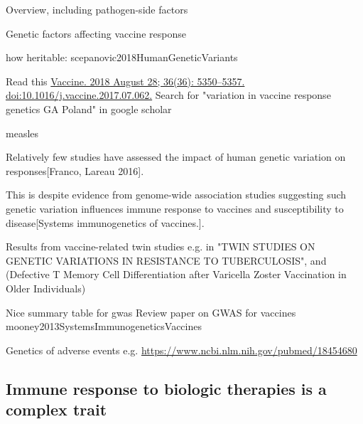 \begin{outline}
    Overview, including pathogen-side factors

Genetic factors affecting vaccine response


how heritable: scepanovic2018HumanGeneticVariants

    Read this \url{Vaccine. 2018 August 28; 36(36): 5350–5357. doi:10.1016/j.vaccine.2017.07.062.}
    Search for "variation in vaccine response genetics GA Poland" in google scholar



    measles

    Relatively few studies have assessed the impact of human genetic variation on responses[Franco, Lareau 2016].

    This is despite evidence from genome-wide association studies suggesting such genetic variation influences immune response to vaccines and susceptibility to disease[Systems immunogenetics of vaccines.].

    Results from vaccine-related twin studies e.g. in "TWIN STUDIES ON GENETIC VARIATIONS IN RESISTANCE TO TUBERCULOSIS", and (Defective T Memory Cell Differentiation after Varicella Zoster Vaccination in Older Individuals)

    Nice summary table for gwas 
    Review paper on GWAS for vaccines mooney2013SystemsImmunogeneticsVaccines

    Genetics of adverse events e.g. \url{https://www.ncbi.nlm.nih.gov/pubmed/18454680}

\subsection{Immune response to biologic therapies is a complex trait}


\end{outline}
